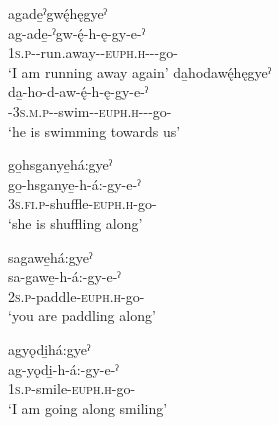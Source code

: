 \ea\label{ex:purpprogsufex8}  
\ea agade̱ˀgwę́hęgyeˀ\\
\gll ag-ade̱-ˀgw-ę́-h-ę-gy-e-ˀ\\
 \textsc{1s.p}-{\semireflexive}-run.away-{\stative}-\textsc{euph.h}-{\joiner}-{\progressive}-go-{\stative}\\
\glt `I am running away again'
\ex da̱hodawę́hęgyeˀ\\
\gll da̱-ho-d-aw-ę́-h-ę-gy-e-ˀ\\
 {\cislocative}-\textsc{3s.m.p}-{\semireflexive}-swim-{\stative}-\textsc{euph.h}-{\joiner}-{\progressive}-go-{\stative}\\
\glt `he is swimming towards us'

\z
\z

\newpage
\ea\label{ex:purpprogsufex9}  
\ea go̱hsganye̱há:gyeˀ\\
\gll go̱-hsganye̱-h-á:-gy-e-ˀ\\
 \textsc{3s.fi.p}-shuffle-\textsc{euph.h}\exsc{-\joiner-\progressive}-go-{\stative}\\
\glt `she is shuffling along'

\ex sagawe̱há:gyeˀ\\
\gll sa-gawe̱-h-á:-gy-e-ˀ\\
 \textsc{2s.p}-paddle-\textsc{euph.h}\exsc{-\joiner-\progressive}-go-{\stative}\\
\glt `you are paddling along'

\ex agyǫdi̱há:gyeˀ\\
\gll ag-yǫdi̱-h-á:-gy-e-ˀ\\
 \textsc{1s.p}-smile-\textsc{euph.h}\exsc{-\joiner-\progressive}-go-{\stative}\\
\glt `I am going along smiling'

